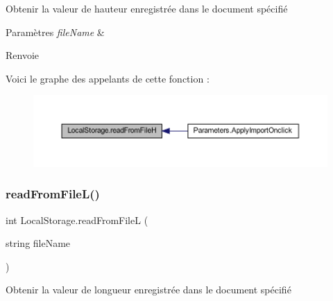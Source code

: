 Obtenir la valeur de hauteur enregistrée dans le document spécifié 


\begin{DoxyParams}{Paramètres}
{\em file\+Name} & \\
\hline
\end{DoxyParams}
\begin{DoxyReturn}{Renvoie}

\end{DoxyReturn}
Voici le graphe des appelants de cette fonction \+:
\nopagebreak
\begin{figure}[H]
\begin{center}
\leavevmode
\includegraphics[width=350pt]{class_local_storage_ab0e31baa14b85dc8a8bd21aa1d53ab09_icgraph}
\end{center}
\end{figure}
\mbox{\label{class_local_storage_a2216bc871c8298023f62119bcdf7edb4}} 
\subsubsection{\texorpdfstring{read\+From\+File\+L()}{readFromFileL()}}
{\footnotesize\ttfamily int Local\+Storage.\+read\+From\+FileL (\begin{DoxyParamCaption}\item[{string}]{file\+Name }\end{DoxyParamCaption})\hspace{0.3cm}{\ttfamily [inline]}}



Obtenir la valeur de longueur enregistrée dans le document spécifié 


